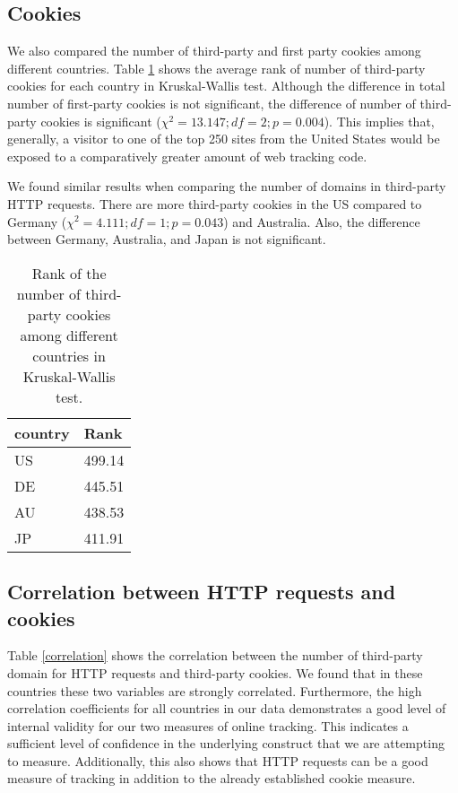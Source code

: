 \documentclass[conference]{IEEEtran}
\newcommand{\todo}[1]{}
\renewcommand{\todo}[1]{{\color{red} TODO: {#1}}}
\begin{document}
\subsection{Cookies}
We also compared the number of third-party and first party cookies among different countries. 
Table \ref{thirdcookie} shows the average rank of number of third-party cookies for each country in Kruskal-Wallis test. Although the difference in total number of first-party cookies is not significant, the difference of number of third-party cookies is significant ($\chi^{2}=13.147; df=2; p=0.004$). This implies that, generally, a visitor to one of the top 250 sites from the United States would be exposed to a comparatively greater amount of web tracking code.

We found similar results when comparing the number of domains in third-party HTTP requests. There are more third-party cookies in the US compared to Germany ($\chi^{2} = 4.111; df=1; p=0.043$) and Australia. Also, the difference between Germany, Australia, and Japan is not significant.

\begin{table}[t]
\centering
\caption{Rank of the number of third-party cookies among different countries in Kruskal-Wallis test.}
\label{thirdcookie}
\begin{tabular}{|l|l|}
\hline
\textbf{country} & \textbf{Rank} \\ \hline
US               & 499.14        \\ \hline
DE               & 445.51        \\ \hline
AU               & 438.53        \\ \hline
JP               & 411.91        \\ \hline
\end{tabular}
\end{table}


\subsection{Correlation between HTTP requests and cookies}
Table \ref{correlation} shows the correlation between the number of third-party domain for HTTP requests and third-party cookies. We found that in these countries these two variables are strongly correlated. Furthermore, the high correlation coefficients for all countries in our data demonstrates a good level of internal validity for our two measures of online tracking. This indicates a sufficient level of confidence in the underlying construct that we are attempting to measure. Additionally, this also shows that HTTP requests can be a good measure of tracking in addition to the already established cookie measure.
 
\end{document}

